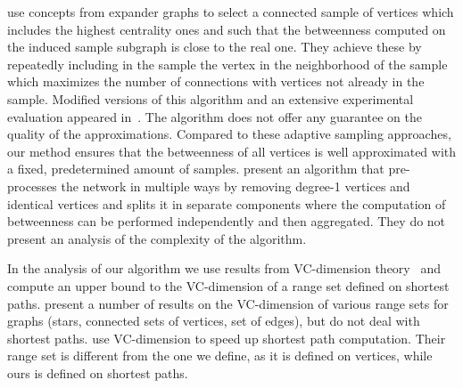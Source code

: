 \citet{MaiyaBW10} use concepts from expander
graphs to select a connected sample of vertices which includes the highest
centrality ones and such that the betweenness computed on the induced sample
subgraph is close to the real one.  They achieve these by repeatedly including
in the sample the vertex in the neighborhood of the sample which maximizes the
number of connections with vertices not already in the sample. Modified versions
of this algorithm and an extensive experimental evaluation appeared
in~\citep{LimMRTB11}. The algorithm does not offer any guarantee on the quality
of the approximations. Compared to these adaptive sampling approaches, our
method ensures that the betweenness of all vertices is well approximated with a
fixed, predetermined amount of samples.  \citep{SaryuceSKC13} present an
algorithm that pre-processes the network in multiple ways by removing degree-1
vertices and identical vertices and splits it in separate components where the
computation of betweenness can be performed independently and then aggregated.
They do not present an analysis of the complexity of the algorithm. 

In the analysis of our algorithm we use results from VC-dimension
theory~\citep{VapnikC71} and compute an upper bound to the VC-dimension of a
range set defined on shortest paths. \citet{KranakisKRUW97} present a number of
results on the VC-dimension of various range sets for graphs (stars, connected
sets of vertices, set of edges), but do not deal with shortest paths.
\citet{AbrahamDFGW11} use VC-dimension to speed up shortest path computation.
Their range set is different from the one we define, as it is defined on
vertices, while ours is defined on shortest paths.

